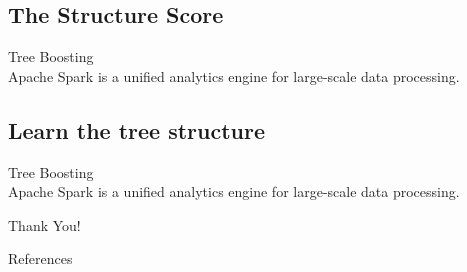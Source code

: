 \subsection{The Structure Score}
\begin{frame}[plain,t]{Tree Boosting} %
     \\  \vspace{2ex}
    Apache Spark is a unified analytics engine for large-scale data processing.
    
    
    
    
\end{frame}

\subsection{Learn the tree structure}
\begin{frame}[plain,t]{Tree Boosting} %
     \\  \vspace{2ex}
    Apache Spark is a unified analytics engine for large-scale data processing.
    
    
    
    
\end{frame}





\begin{frame}[plain]
    \huge
    \vfill
    \centerline{  }
    \vfill
    
\end{frame}
\begin{frame}[plain]
    \huge
    \vfill
    \centerline{  }
    \vfill
    \Huge
    \centerline{\alert{Thank You!} }
    \vfill
\end{frame}

\begin{frame}{References}
    
   
    
\end{frame}  
 

